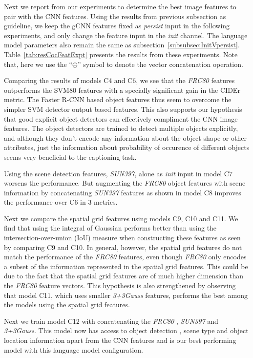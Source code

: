 Next we report from our experiments to determine the best image features to pair
with the CNN features.
Using the results from previous subsection as guideline, we keep the gCNN
features fixed as \emph{persist} input in the following experiments, and only change the
feature input in the \emph{init} channel.
The language model parameters also remain the same as
subsection~\ref{subsubsec:InitVpersist}.
Table~\ref{tab:resCocFeatExpt} presents the results from these experiments.
Note that, here we use the ``$\oplus$'' symbol to denote the vector
concatenation operation.

Comparing the results of models C4 and C6, we see that the \emph{FRC80} features
outperforms the SVM80 features with a specially significant gain in the CIDEr
metric.
The Faster R-CNN based object features thus seem to overcome the simpler SVM
detector output based features.
This also supports our hypothesis that good explicit object detectors can
effectively compliment the CNN image features. 
The object detectors are trained to detect multiple objects explicitly, and
although they don't encode any information about the object shape or other
attributes, just the information about probability of occurence of different
objects seems very beneficial to the captioning task.

Using the scene detection features, \emph{SUN397}, alone as \emph{init} input in
model C7 worsens the performance.
But augmenting the \emph{FRC80} object features with scene information by
concatenating \emph{SUN397} features as shown in model C8 improves the
performance over C6 in 3 metrics.

Next we compare the spatial grid features using models C9, C10 and C11.
We find that using the integral of Gaussian performs better than using the
intersection-over-union (IoU) measure when constructing these features as seen
by comparing C9 and C10. 
In general, however, the spatial grid features do not match the performance of
the \emph{FRC80} features, even though \emph{FRC80} only encodes a subset of the
information represented in the spatial grid features.
This could be due to the fact that the spatial grid features are of much higher
dimension than the \emph{FRC80} feature vectors.
This hypothesis is also strengthened by observing that model C11, which uses
smaller \emph{3+3Gauss} features, performs the best among the models using the
spatial grid features.

Next we train model C12 with concatenating the \emph{FRC80} , \emph{SUN397}  and
\emph{3+3Gauss}. 
This model now has access to object detection , scene type and object location
information apart from the CNN features and is our best performing model with
this language model configuration.

